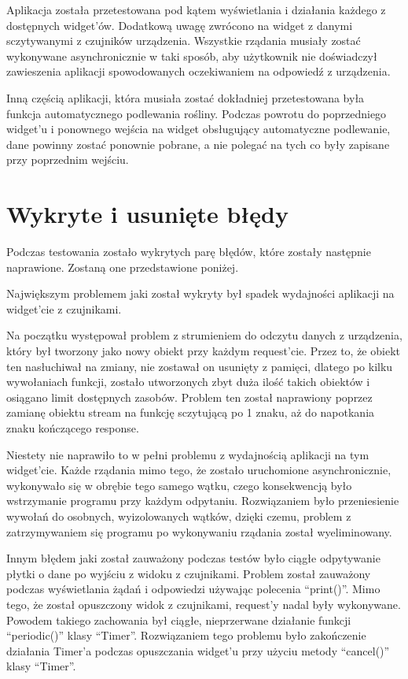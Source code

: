 \documentclass[a4paper,twoside,12pt]{book}
\begin{document}
Aplikacja została przetestowana pod kątem wyświetlania i działania każdego z dostępnych widget'ów. Dodatkową uwagę zwrócono na widget z danymi sczytywanymi z czujników urządzenia. Wszystkie rządania musiały zostać wykonywane asynchronicznie w taki sposób, aby użytkownik nie doświadczył zawieszenia aplikacji spowodowanych oczekiwaniem na odpowiedź z urządzenia.

Inną częścią aplikacji, która musiała zostać dokładniej przetestowana była funkcja automatycznego podlewania rośliny. Podczas powrotu do poprzedniego widget'u i ponownego wejścia na widget obsługujący automatyczne podlewanie, dane powinny zostać ponownie pobrane, a nie polegać na tych co były zapisane przy poprzednim wejściu.

\section{Wykryte i usunięte błędy}

Podczas testowania zostało wykrytych parę błędów, które zostały następnie naprawione. Zostaną one przedstawione poniżej.

Największym problemem jaki został wykryty był spadek wydajności aplikacji na widget'cie z czujnikami.

Na początku występował problem z strumieniem do odczytu danych z urządzenia, który był tworzony jako nowy obiekt przy każdym request'cie. Przez to, że obiekt ten nasłuchiwał na zmiany, nie zostawał on usunięty z pamięci, dlatego po kilku wywołaniach funkcji, zostało utworzonych zbyt duża ilość takich obiektów i osiągano limit dostępnych zasobów. Problem ten został naprawiony poprzez zamianę obiektu stream na funkcję sczytującą po 1 znaku, aż do napotkania znaku kończącego response.

Niestety nie naprawiło to w pełni problemu z wydajnością aplikacji na tym widget'cie. Każde rządania mimo tego, że zostało uruchomione asynchronicznie, wykonywało się w obrębie tego samego wątku, czego konsekwencją było wstrzymanie programu przy każdym odpytaniu. Rozwiązaniem było przeniesienie wywołań do osobnych, wyizolowanych wątków, dzięki czemu, problem z zatrzymywaniem się programu po wykonywaniu rządania został wyeliminowany.

Innym błędem jaki został zauważony podczas testów było ciągłe odpytywanie płytki o dane po wyjściu z widoku z czujnikami. Problem został zauważony podczas wyświetlania żądań i odpowiedzi używając polecenia ``print()''. Mimo tego, że został opuszczony widok z czujnikami, request'y nadal były wykonywane. Powodem takiego zachowania był ciągłe, nieprzerwane działanie funkcji ``periodic()'' klasy ``Timer''. Rozwiązaniem tego problemu było zakończenie działania Timer'a podczas opuszczania widget'u przy użyciu metody ``cancel()'' klasy ``Timer''.
\end{document}
